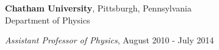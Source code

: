



{\bf Chatham University}, Pittsburgh, Pennsylvania\\
Department of Physics
\begin{list1}
\item[] {\em  Assistant Professor of Physics}, August 2010 - July 2014
\end{list1}



